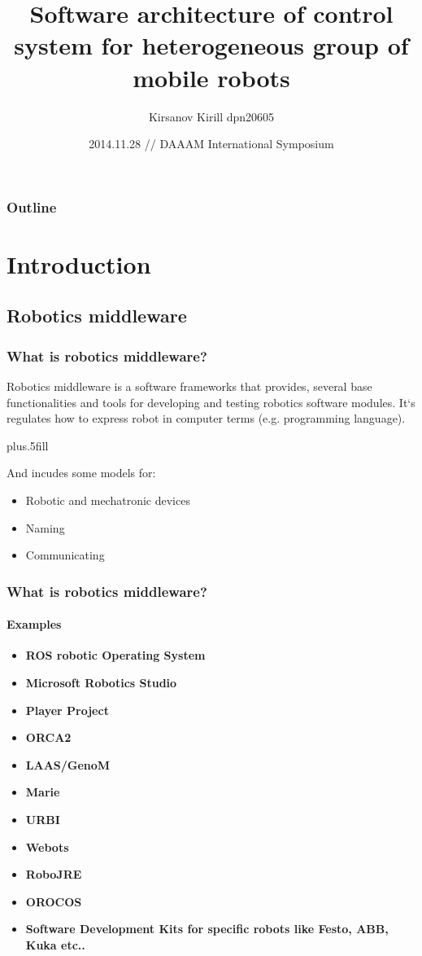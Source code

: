 \documentclass{beamer}
\title{Software architecture of control system for heterogeneous group of mobile
robots}
\author{Kirsanov Kirill\inst{1} dpn20605}
\institute
{
\inst{1}
Laboratory "Sensorika", Miusskaya sq., 4, 125047, Moscow, Russia
}
\date{2014.11.28 // DAAAM International Symposium}
\begin{document}
\begin{frame}
\titlepage
\end{frame}

\begin{frame}
\frametitle{Outline}
\tableofcontents
\end{frame}

\section{Introduction}
\subsection{Robotics middleware}
\begin{frame}
\frametitle{What is robotics middleware?}
Robotics middleware is a software frameworks that provides, several
base functionalities and tools for developing and testing robotics software
modules.
It`s regulates how to express robot in computer terms (e.g. programming
language).

\vskip0pt plus.5fill

And incudes some models for:
\begin{itemize}
  \item Robotic and mechatronic devices
  \item Naming
  \item Communicating
\end{itemize}


\end{frame}


\begin{frame}
\frametitle{What is robotics middleware?}
\framesubtitle{Examples}
\begin{itemize}
\item<1> \textbf{ROS robotic Operating System}
\item<1> \textbf{Microsoft Robotics Studio} 
\item<1> \textbf{Player Project} 
\item<1> \textbf{ORCA2} 
\item<1> \textbf{LAAS/GenoM} 
\item<1> \textbf{Marie} 
\item<1> \textbf{URBI} 
\item<1> \textbf{Webots} 
\item<1> \textbf{RoboJRE}
\item<1> \textbf{OROCOS}
\item<1> \textbf{Software Development Kits for specific robots like Festo, ABB,
Kuka etc..}
\end{itemize}
\end{frame}
\end{document}
